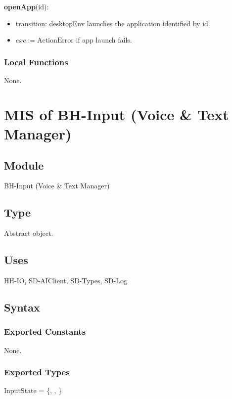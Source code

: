 \documentclass[12pt, titlepage]{article}
\begin{document}
\noindent
\textbf{openApp}(id):
\begin{itemize}
  \item transition: desktopEnv launches the application identified by id.
  \item $exc := \text{ActionError}$ if app launch fails.
\end{itemize}

\subsubsection{Local Functions}

None.

\section{MIS of BH-Input (Voice \& Text Manager)} \label{mod:BHInput}

\subsection{Module}

BH-Input (Voice \& Text Manager)

\subsection{Type}

Abstract object.

\subsection{Uses}

HH-IO, SD-AIClient, SD-Types, SD-Log

\subsection{Syntax}

\subsubsection{Exported Constants}

None.

\subsubsection{Exported Types}

\noindent
InputState = \{, , \}
\end{document}
